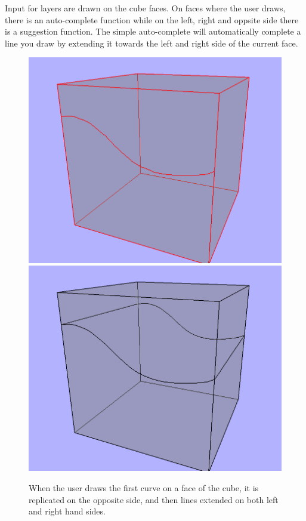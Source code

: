 \documentclass[a4paper,12pt]{article}
\begin{document}
Input for layers are drawn on the cube faces. On faces where the user draws, there is an auto-complete function while on the left, right and oppsite side there is a suggestion function. The simple auto-complete will automatically complete a line you draw by extending it towards the left and right side of the current face. 

\begin{figure}
\includegraphics[width=.5\linewidth]{thesis/suggestion1.png}
\includegraphics[width=.5\linewidth]{thesis/suggestion2.png}
 \caption{When the user draws the first curve on a face of the cube, it is replicated on the opposite side, and then lines extended on both left and right hand sides.}
 \label{fig:suggest}
\end{figure}
\end{document}
